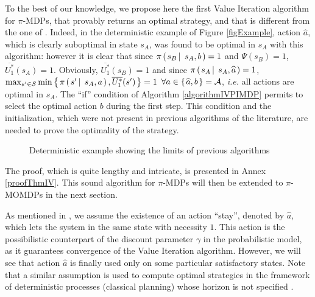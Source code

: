 To the best of our knowledge, we propose here the first Value Iteration algorithm 
 for $\pi$-MDPs, 
that provably returns an optimal strategy, and that is different
from the one of \cite{Sabbadin2001287}. Indeed, in the deterministic example of Figure \ref{figExample},
 action $\widehat{a}$, which is clearly suboptimal in state $s_A$, 
was found to be optimal in $s_A$ with this algorithm: 
however it is clear that since 
$\pi \left( \left.  s_B \, \right| \left. \, s_A, b \right. \right) = 1$ and $\Psi(s_B)=1$, $\overline{U^*_1}(s_A) = 1$.
 Obviously, $\overline{U^*_1}(s_B) = 1$ and since
$\pi \left( \left.  s_A \, \right| \left. \, s_A, \widehat{a}  \right. \right) = 1$,
$\max_{s' \in \mathcal{S}} \min \left\{ \left.  \pi  \left( \left.  s' \, \right| \left. \, s_A,a  \right. \right), \overline{U^*_1}(s')  \right. \right\} 
= 1$ $\forall a \in \left\{ \left.  \widehat{a}, b  \right. \right\} = \mathcal{A}$, 
\textit{i.e.} all actions are optimal in $s_A$. 
The ``if'' condition of Algorithm \ref{algorithmIVPIMDP} 
permits to select the optimal action $b$ during the first step. 
This condition and the initialization, 
which were not present in previous algorithms of the literature, 
are needed to prove the optimality of the strategy.
\begin{figure} \caption{Deterministic example showing the limits of previous algorithms}\centering
{}
\end{figure}
The proof, which is quite lengthy and intricate, 
is presented in Annex \ref{proofThmIV}. 
This sound algorithm for $\pi$-MDPs 
will then be extended to $\pi$-MOMDPs in the next section.

As mentioned in \cite{Sabbadin:1999:pipomdp}, 
we assume the existence of an action ``stay'', 
denoted by $\widehat{a}$, 
which lets the system in the same state with necessity $1$. 
This action is the possibilistic counterpart 
of the discount parameter $\gamma$ in the probabilistic model, 
as it guarantees convergence of the Value Iteration algorithm. 
However, we will see that action $\widehat{a}$ 
is finally used only on some particular satisfactory states. 
Note that a similar assumption is used to compute optimal strategies
in the framework of deterministic processes (classical planning)
whose horizon is not specified \cite{LaValle2006PA1213331}.

